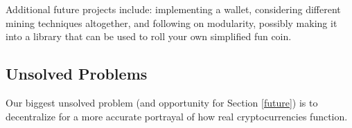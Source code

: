 \documentclass[12pt]{article}
\begin{document}
Additional future projects include: implementing a wallet, considering different mining techniques altogether, and following on modularity, possibly making it into a library that can be used to roll your own simplified fun coin.

\subsection{Unsolved Problems}\label{unsolved}
Our biggest unsolved problem (and opportunity for Section \ref{future}) is to decentralize for a more accurate portrayal of how real cryptocurrencies function.



\end{document}
